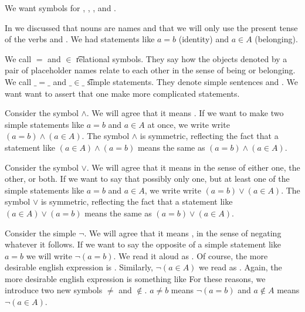 

We want symbols for , , , and .


In  we discussed that nouns are names and that we will only use the present tense of the verbs  and .
We had statements like ${a}={b}$ (identity) and $a \in A$ (belonging).

We call $=$ and $\in$ \t{relational symbols}.
They say how the objects denoted by a pair of placeholder names relate to each other in the sense of being or belonging.
We call $\_=\_$ and $\_\in\_$ \t{simple statements}.
They denote simple sentences  and .
We want want to assert that one make more complicated statements.



Consider the symbol $\land$.
We will agree that it means .
If we want to make two simple statements like $a = b$ and $a \in A$ at once, we write write $(a = b) \land (a \in A)$.
The symbol $\land$ is symmetric, reflecting the fact that a statement like $(a \in A) \land (a = b)$ means the same as $(a = b) \land (a \in A)$.


Consider the symbol $\lor$.
We will agree that it means  in the sense of either one, the other, or both.
If we want to say that possibly only one, but at least one of the simple statements like $a = b$ and $a \in A$, we write write $(a = b) \lor (a \in A)$.
The symbol $\lor$ is symmetric, reflecting the fact that a statement like $(a \in A) \lor (a = b)$ means the same as $(a = b) \lor (a \in A)$.


Consider the simple $\neg$.
We will agree that it means , in the sense of negating whatever it follows.
If we want to say the opposite of a simple statement like $a = b$ we will write $\neg(a = b)$.
We read it aloud as .
Of course, the more desirable english expression is .
Similarly, $\neg(a \in A)$ we read as .
Again, the more desirable english expression is something like 
For these reasons, we introduce two new symbols $\neq$ and $\not\in$.
$a \neq b$ means $\neg(a = b)$ and $a \not\in A$ means $\neg(a \in A)$.

